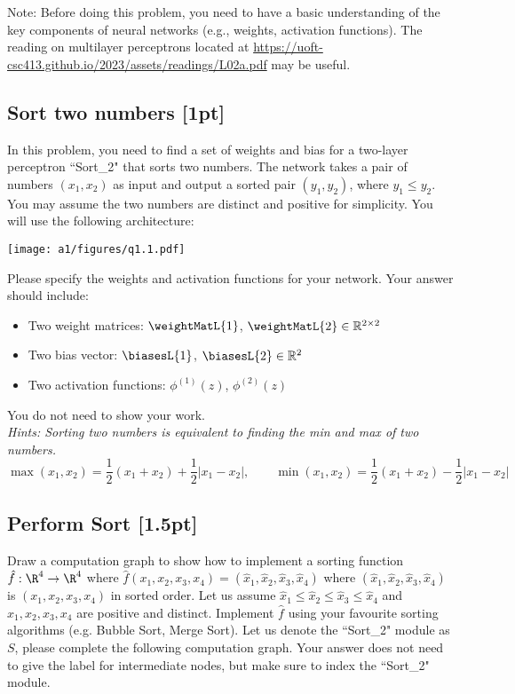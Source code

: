 \noindent Note: Before doing this problem, you need to have a basic understanding of the key components of neural networks (e.g., weights, activation functions). The reading on multilayer perceptrons located at \url{https://uoft-csc413.github.io/2023/assets/readings/L02a.pdf} may be useful. 

\subsection{Sort two numbers {\color{blue}[1pt]}}\label{sort_2}
    In this problem, you need to find a set of weights and bias for a two-layer perceptron ``Sort\_2" that sorts two numbers. The network takes a pair of numbers $(x_1, x_2)$ as input and output a sorted pair $(y_1, y_2)$, where $y_1 \leq y_2$. You may assume the two numbers are distinct and positive for simplicity. You will use the following architecture:
    \begin{center}
        \texttt{[image: a1/figures/q1.1.pdf]}
    \end{center}
    
    \noindent Please specify the weights and activation functions for your network.
    Your answer should include: 
    \begin{itemize}
        \item Two weight matrices: $\weightMatL{1}$, $\weightMatL{2} \in \mathbb{R}^{2 \times 2}$
        \item Two bias vector: $\biasesL{1}$, $\biasesL{2} \in \mathbb{R}^{2}$ 
        \item Two activation functions: $\phi^{(1)}(z)$, $\phi^{(2)}(z)$
    \end{itemize}
    You do not need to show your work. \\
    
    \noindent \emph{Hints: Sorting two numbers is equivalent to finding the min and max of two numbers.} \\
    $$\max(x_1,x_2) = \frac{1}{2}(x_1+x_2)+\frac{1}{2}|x_1-x_2|,\qquad \min(x_1,x_2) = \frac{1}{2}(x_1+x_2)-\frac{1}{2}|x_1-x_2|$$

\subsection{Perform Sort {\color{blue}[1.5pt]}\EC}\label{sec:perform_sort}
    Draw a computation graph to show how to implement a sorting function $\hat{f}:\R^4 \to \R^4$ where $\hat{f}(x_1, x_2, x_3, x_4) = (\hat{x}_1, \hat{x}_2, \hat{x}_3, \hat{x}_4)$ where $(\hat{x}_1, \hat{x}_2, \hat{x}_3, \hat{x}_4)$ is $(x_1, x_2, x_3, x_4)$ in sorted order.
    Let us assume $\hat{x}_1 \leq \hat{x}_2 \leq \hat{x}_3 \leq \hat{x}_4$ and $x_1, x_2, x_3, x_4$ are positive and distinct. Implement $\hat{f}$ using your favourite sorting algorithms (e.g. Bubble Sort, Merge Sort). Let us denote the ``Sort\_2" module as $S$, please complete the following computation graph. Your answer does not need to give the label for intermediate nodes, but make sure to index the ``Sort\_2" module.
    
